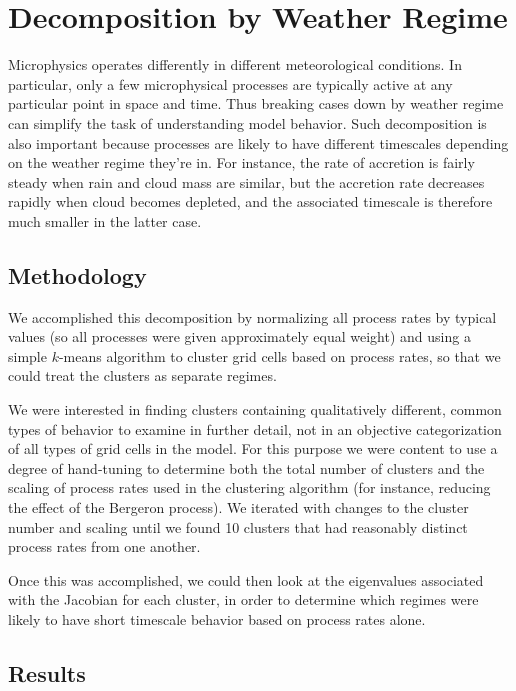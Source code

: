 \documentclass [11pt, proquest] {uwthesis}[2020/02/24]
\begin{document}
\section{Decomposition by Weather Regime} \label{sec:MG2-regime}

Microphysics operates differently in different meteorological conditions. In particular, only a few microphysical processes are typically active at any particular point in space and time. Thus breaking cases down by weather regime can simplify the task of understanding model behavior. Such decomposition is also important because processes are likely to have different timescales depending on the weather regime they're in. For instance, the rate of accretion is fairly steady when rain and cloud mass are similar, but the accretion rate decreases rapidly when cloud becomes depleted, and the associated timescale is therefore much smaller in the latter case.

\subsection{Methodology}

We accomplished this decomposition by normalizing all process rates by typical values (so all processes were given approximately equal weight) and using a simple $k$-means algorithm to cluster grid cells based on process rates, so that we could treat the clusters as separate regimes.

We were interested in finding clusters containing qualitatively different, common types of behavior to examine in further detail, not in an objective categorization of all types of grid cells in the model. For this purpose we were content to use a degree of hand-tuning to determine both the total number of clusters and the scaling of process rates used in the clustering algorithm (for instance, reducing the effect of the Bergeron process). We iterated with changes to the cluster number and scaling until we found \num{10} clusters that had reasonably distinct process rates from one another.

Once this was accomplished, we could then look at the eigenvalues associated with the Jacobian for each cluster, in order to determine which regimes were likely to have short timescale behavior based on process rates alone.

\subsection{Results}
\end{document}
